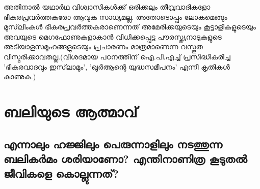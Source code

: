അതിനാല്‍ യഥാര്‍ഥ വിശ്വാസികള്‍ക്ക് ഒരിക്കലും തീവ്രവാദികളോ ഭീകരപ്രവര്‍ത്തകരോ ആവുക സാധ്യമല്ല. അതോടൊപ്പം ലോകമെങ്ങും മുസ്‌ലിംകള്‍ ഭീകരപ്രവര്‍ത്തകരാണെന്നത് അമേരിക്കയുടെയും കൂട്ടാളികളുടെയും അവയുടെ മെഗഫോണുകളാകാന്‍ വിധിക്കപ്പെട്ട പൗരസ്ത്യനാടുകളുടെ അടിയാളസമൂഹങ്ങളുടെയും പ്രചാരണം മാത്രമാണെന്ന വസ്തുത വിസ്മരിക്കാവതല്ല.(വിശദമായ പഠനത്തിന് ഐ.പി.എച്ച് പ്രസിദ്ധീകരിച്ച 'ഭീകരവാദവും ഇസ്‌ലാമും', 'ഖുര്‍ആന്റെ യുദ്ധസമീപനം' എന്നീ കൃതികള്‍ കാണുക.)
\chapter{ബലിയുടെ ആത്മാവ് }
  \section{എന്നാലും ഹജ്ജിലും പെരുന്നാളിലും നടത്തുന്ന ബലികര്‍മം ശരിയാണോ? എന്തിനാണിത്ര കൂടുതല്‍ ജീവികളെ കൊല്ലുന്നത്?}
    
